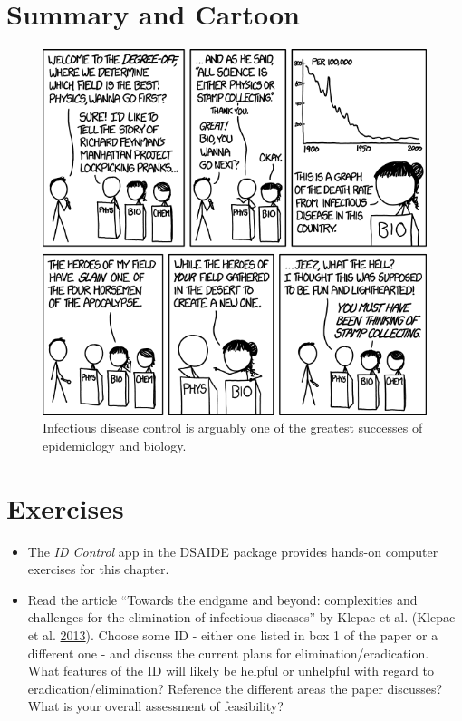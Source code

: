 \documentclass[]{book}
\providecommand{\tightlist}{%
  \setlength{\itemsep}{0pt}\setlength{\parskip}{0pt}}
\theoremstyle{definition}
\theoremstyle{definition}
\theoremstyle{definition}
\theoremstyle{remark}
\begin{document}
\section{Summary and Cartoon}\label{summary-and-cartoon-8}

\begin{figure}
\centering
\includegraphics{./images/xkcd-disease-eradication.png}
\caption{Infectious disease control is arguably one of the greatest
successes of epidemiology and biology.}
\end{figure}

\section{Exercises}\label{exercises-8}

\begin{itemize}
\tightlist
\item
  The \emph{ID Control} app in the DSAIDE package provides hands-on
  computer exercises for this chapter.
\item
  Read the article ``Towards the endgame and beyond: complexities and
  challenges for the elimination of infectious diseases'' by Klepac et
  al. (Klepac et al. \protect\hyperlink{ref-klepac13}{2013}). Choose
  some ID - either one listed in box 1 of the paper or a different one -
  and discuss the current plans for elimination/eradication. What
  features of the ID will likely be helpful or unhelpful with regard to
  eradication/elimination? Reference the different areas the paper
  discusses? What is your overall assessment of feasibility?
\end{itemize}
\end{document}
